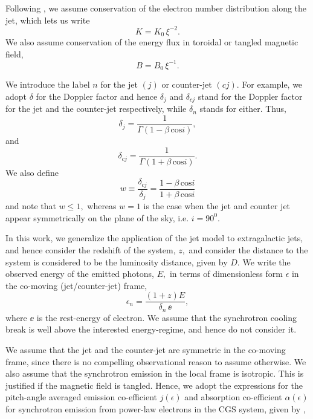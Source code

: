 Following \citealt{Blandford_&_Konigl-1979-ApJ}, we assume conservation of the electron number distribution along the jet, which lets us write
\begin{equation}
K = K_0 \, \xi^{-2}. \label{eq:K}
\end{equation}
We also assume conservation of the energy flux in toroidal or tangled magnetic field,
\begin{equation}
B = B_0 \, \xi^{-1}. \label{eq:B}
\end{equation}

We introduce the label $ n $ for the jet $ (j) $ or counter-jet $ (cj) . $ For example, we adopt $ \delta $ for the Doppler factor and hence $ \delta_{j} $ and $ \delta_{cj} $ stand for the Doppler factor for the jet and the counter-jet respectively, while $ \delta_{n} $ stands for either. Thus,
\begin{equation}
\delta_j = \dfrac{1}{\Gamma \left( 1 - \beta\mathrm{\,cos}i\right) },\label{eq:Doppler_factor_for_jet}
\end{equation} and
\begin{equation}
\delta_{cj} = \dfrac{1}{\Gamma \left( 1 + \beta\mathrm{\,cos}i\right) }.\label{eq:Doppler_factor_for_counterjet}
\end{equation}
We also define \begin{equation}
w \equiv \frac{\delta_{cj}}{\delta_{j}} = \dfrac{1 - \beta\mathrm{\,cos}i}{1 + \beta\mathrm{\,cos}i} \label{eq:w}
\end{equation} and note that $ w \leq 1, $ whereas $ w = 1 $ is the case when the jet and counter jet appear symmetrically on the plane of the sky, i.e. $ i = 90^{0}. $

In this work, we generalize the application of the jet model to extragalactic jets, and hence consider the redshift of the system, $ z, $ and consider the distance to the system is considered to be the luminosity distance, given by $ D. $ We write the observed energy of the emitted photons, $ E, $ in terms of dimensionless form $ \epsilon $ in the co-moving (jet/counter-jet) frame,
\begin{equation}
\epsilon_{n} = \frac{ (1+z) E }{ \delta_{n} \, \ee }, \label{eq:epsa_n}
\end{equation} where $ \ee $ is the rest-energy of electron. We assume that the synchrotron cooling break is well above the interested energy-regime, and hence do not consider it.

We assume that the jet and the counter-jet are symmetric in the co-moving frame, since there is no compelling observational reason to assume otherwise. We also assume that the synchrotron emission in the local frame is isotropic. This is justified if the magnetic field is tangled. Hence, we adopt the expressions for the pitch-angle averaged emission co-efficient $ j \left( \epsilon \right) $ and absorption co-efficient $\alpha(\epsilon)$ for synchrotron emission from power-law electrons in the CGS system, given by \citep{Longair-3rd_Ed.,Zdziarski_et_al.-2012-MNRAS-MeV_tail_CX1},

